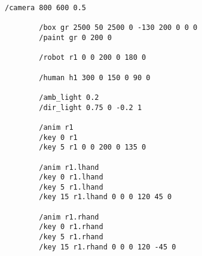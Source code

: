 \clearpage

\begin{center}
	\captionsetup{justification=raggedright,singlelinecheck=off}
	\begin{lstlisting}[label=lst:scene_txt, caption=Пример файла описания сцены]
		/camera 800 600 0.5
		
		/box gr 2500 50 2500 0 -130 200 0 0 0
		/paint gr 0 200 0
		
		/robot r1 0 0 200 0 180 0
		
		/human h1 300 0 150 0 90 0
		
		/amb_light 0.2
		/dir_light 0.75 0 -0.2 1
		
		/anim r1
		/key 0 r1
		/key 5 r1 0 0 200 0 135 0
		
		/anim r1.lhand
		/key 0 r1.lhand
		/key 5 r1.lhand
		/key 15 r1.lhand 0 0 0 120 45 0
		
		/anim r1.rhand
		/key 0 r1.rhand
		/key 5 r1.rhand
		/key 15 r1.rhand 0 0 0 120 -45 0
\end{lstlisting}
\end{center}

\clearpage
